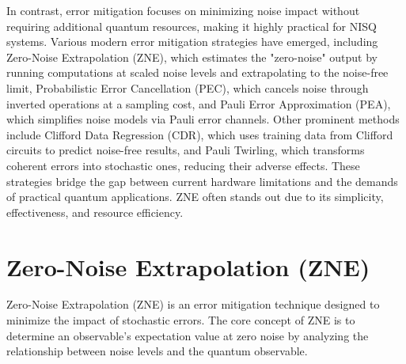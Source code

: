 \documentclass[12pt]{article}
\begin{document}
In contrast, error mitigation focuses on minimizing noise impact without requiring additional quantum resources, making it highly practical for NISQ systems. Various modern error mitigation strategies have emerged, including Zero-Noise Extrapolation (ZNE), which estimates the "zero-noise" output by running computations at scaled noise levels and extrapolating to the noise-free limit, Probabilistic Error Cancellation (PEC), which cancels noise through inverted operations at a sampling cost, and Pauli Error Approximation (PEA), which simplifies noise models via Pauli error channels. Other prominent methods include Clifford Data Regression (CDR), which uses training data from Clifford circuits to predict noise-free results, and Pauli Twirling, which transforms coherent errors into stochastic ones, reducing their adverse effects. These strategies bridge the gap between current hardware limitations and the demands of practical quantum applications. ZNE often stands out due to its simplicity, effectiveness, and resource efficiency.

\section{Zero-Noise Extrapolation (ZNE)}
Zero-Noise Extrapolation (ZNE) \cite{li-PhysRevX.7.021050} \cite{temme-PhysRevLett.119.180509} is an error mitigation technique designed to minimize the impact of stochastic errors. The core concept of ZNE is to determine an observable's expectation value at zero noise by analyzing the relationship between noise levels and the quantum observable.
\end{document}
